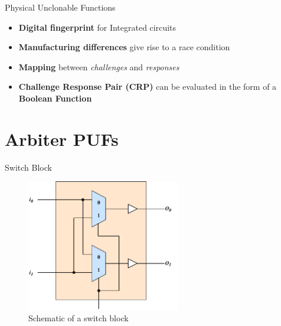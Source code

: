 \documentclass[10pt, compress]{beamer}
\begin{document}
\begin{frame}{Physical Unclonable Functions}
    \begin{itemize}[itemsep=0.5cm]
        \item \textbf{Digital fingerprint} for Integrated circuits
        \item \textbf{Manufacturing differences} give rise to a race condition
        \item \textbf{Mapping} between \textit{challenges} and \textit{responses}
        \item \textbf{Challenge Response Pair (CRP)} can be evaluated in the form of a \textbf{Boolean Function}
    \end{itemize}
\end{frame}

\section{Arbiter PUFs} %

\begin{frame}{Switch Block}
    \begin{figure}
        \centering
        \includegraphics[width=0.6\textwidth]{figures/switch_block_detailed.pdf}
        \caption{Schematic of a switch block}
    \end{figure}
\end{frame}
\end{document}
